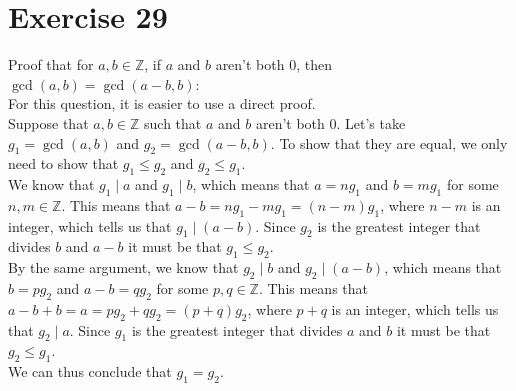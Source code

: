 \documentclass[12pt]{article}
\newcommand{\Z}{\mathbb{Z}}
\begin{document}
    \section*{Exercise 29}
    Proof that for $a, b \in \Z$,
    if $a$ and $b$ aren't both $0$,
    then $\gcd(a, b) = \gcd(a-b, b)$: \\
    For this question, it is easier to use a direct proof. \\
    Suppose that $a, b \in \Z$
    such that $a$ and $b$ aren't both $0$.
    Let's take $g_1 = \gcd(a, b)$ and $g_2 = \gcd(a - b, b)$.
    To show that they are equal,
    we only need to show that $g_1 \leqslant g_2$
    and $g_2 \leqslant g_1$. \\
    We know that $g_1 \mid a$ and $g_1 \mid b$,
    which means that $a = ng_1$ and $b = mg_1$
    for some $n, m \in \Z$.
    This means that $a - b = ng_1 - mg_1 = (n-m)g_1$,
    where $n-m$ is an integer,
    which tells us that $g_1 \mid (a-b)$.
    Since $g_2$ is the greatest integer that
    divides $b$ and $a-b$
    it must be that $g_1 \leqslant g_2$. \\
    By the same argument,
    we know that $g_2 \mid b$ and $g_2 \mid (a-b)$,
    which means that $b = pg_2$ and $a-b = qg_2$
    for some $p, q \in \Z$.
    This means that $a - b + b = a = pg_2 + qg_2 = (p+q)g_2$,
    where $p+q$ is an integer,
    which tells us that $g_2 \mid a$.
    Since $g_1$ is the greatest integer that
    divides $a$ and $b$
    it must be that $g_2 \leqslant g_1$. \\
    We can thus conclude that $g_1 = g_2$. \\
\end{document}
